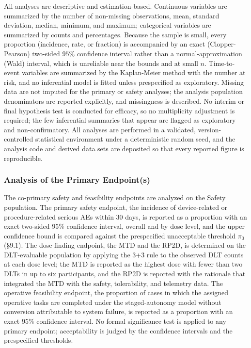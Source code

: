 All analyses are descriptive and estimation-based. Continuous variables are
summarized by the number of non-missing observations, mean, standard deviation,
median, minimum, and maximum; categorical variables are summarized by counts and
percentages. Because the sample is small, every proportion (incidence, rate, or
fraction) is accompanied by an exact (Clopper-Pearson) two-sided $95\%$ confidence
interval rather than a normal-approximation (Wald) interval, which is unreliable
near the bounds and at small $n$. Time-to-event variables are summarized by the
Kaplan-Meier method with the number at risk, and no inferential model is fitted
unless prespecified as exploratory. Missing data are not imputed for the primary
or safety analyses; the analysis population denominators are reported explicitly,
and missingness is described. No interim or final hypothesis test is conducted for
efficacy, so no multiplicity adjustment is required; the few inferential summaries
that appear are flagged as exploratory and non-confirmatory. All analyses are
performed in a validated, version-controlled statistical environment under a
deterministic random seed, and the analysis code and derived data sets are
deposited so that every reported figure is reproducible.

\subsubsection{Analysis of the Primary Endpoint(s)}

The co-primary safety and feasibility endpoints are analyzed on the Safety
population. The primary safety endpoint, the incidence of device-related or
procedure-related serious AEs within 30 days, is reported as a proportion with an
exact two-sided $95\%$ confidence interval, overall and by dose level, and the
upper confidence bound is compared against the prespecified unacceptable threshold
$\pi_0$ (\S9.1). The dose-finding endpoint, the MTD and the RP2D, is determined on
the DLT-evaluable population by applying the 3+3 rule to the observed DLT counts
at each dose level; the MTD is reported as the highest dose with fewer than two
DLTs in up to six participants, and the RP2D is reported with the rationale that
integrated the MTD with the safety, tolerability, and telemetry data. The
operative feasibility endpoint, the proportion of cases in which the assigned
operative tasks are completed under the staged-autonomy model without conversion
attributable to system failure, is reported as a proportion with an exact $95\%$
confidence interval. No formal significance test is applied to any primary
endpoint; acceptability is judged by the confidence intervals and the prespecified
thresholds.

